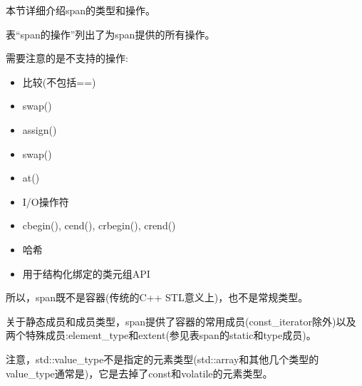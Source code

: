
本节详细介绍span的类型和操作。


表“span的操作”列出了为span提供的所有操作。

需要注意的是不支持的操作:

\begin{itemize}
\item
比较(不包括==)

\item
swap()

\item
assign()

\item
swap()

\item
at()

\item
I/O操作符

\item
cbegin(), cend(), crbegin(), crend()

\item
哈希

\item
用于结构化绑定的类元组API
\end{itemize}

所以，span既不是容器(传统的C++ STL意义上)，也不是常规类型。

关于静态成员和成员类型，span提供了容器的常用成员(const\_iterator除外)以及两个特殊成员:element\_type和extent(参见表span的static和type成员)。

注意，std::value\_type不是指定的元素类型(std::array和其他几个类型的value\_type通常是)，它是去掉了const和volatile的元素类型。

